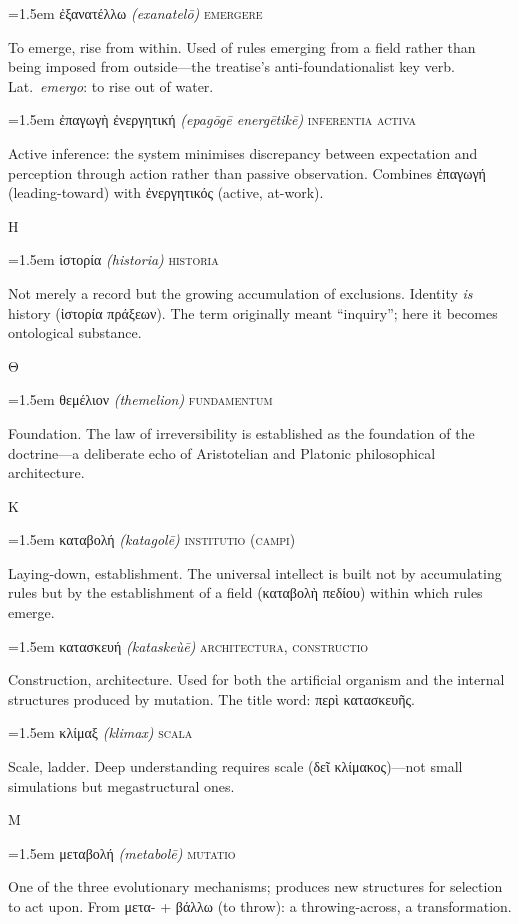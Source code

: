 \documentclass[12pt, oneside, openany]{memoir}
\newcommand{\gk}[1]{\textgreek{#1}}
\newcommand{\gkblue}[1]{{\color{greekblue}\textgreek{#1}}}
\newcommand{\gentry}[4]{%
  \noindent\hangindent=1.5em
  {\gkblue{#1}}\enspace
  {\itshape(#2)}\enspace
  {\color{rubricate}\textperiodcentered}\enspace
  {\scshape #3}\par
  \hspace*{1.5em}%
  \parbox[t]{\dimexpr\linewidth-1.5em\relax}{\strut#4\strut}%
  \par\addvspace{6pt}}
\begin{document}
\gentry{ἐξανατέλλω}{exanatel\={o}}{emergere}
{To emerge, rise from within. Used of rules emerging from a field rather than being imposed from outside---the treatise's anti-foundationalist key verb. Lat.\ \textit{emergo}: to rise out of water.}

\gentry{ἐπαγωγὴ ἐνεργητική}{epag\={o}g\={e} energ\={e}tik\={e}}{inferentia activa}
{Active inference: the system minimises discrepancy between expectation and perception through action rather than passive observation. Combines \gk{ἐπαγωγή} (leading-toward) with \gk{ἐνεργητικός} (active, at-work).}

\bigskip
{\centering\color{rubricate}\large\scshape Η \par}\medskip

\gentry{ἱστορία}{historia}{historia}
{Not merely a record but the growing accumulation of exclusions. Identity \emph{is} history (\gk{ἱστορία πράξεων}). The term originally meant ``inquiry''; here it becomes ontological substance.}

\bigskip
{\centering\color{rubricate}\large\scshape Θ \par}\medskip

\gentry{θεμέλιον}{themelion}{fundamentum}
{Foundation. The law of irreversibility is established as the foundation of the doctrine---a deliberate echo of Aristotelian and Platonic philosophical architecture.}

\bigskip
{\centering\color{rubricate}\large\scshape Κ \par}\medskip

\gentry{καταβολή}{katagol\={e}}{institutio (campi)}
{Laying-down, establishment. The universal intellect is built not by accumulating rules but by the establishment of a field (\gk{καταβολὴ πεδίου}) within which rules emerge.}

\gentry{κατασκευή}{kataskeù\={e}}{architectura, constructio}
{Construction, architecture. Used for both the artificial organism and the internal structures produced by mutation. The title word: \gk{περὶ κατασκευῆς}.}

\gentry{κλίμαξ}{klimax}{scala}
{Scale, ladder. Deep understanding requires scale (\gk{δεῖ κλίμακος})---not small simulations but megastructural ones.}

\bigskip
{\centering\color{rubricate}\large\scshape Μ \par}\medskip

\gentry{μεταβολή}{metabol\={e}}{mutatio}
{One of the three evolutionary mechanisms; produces new structures for selection to act upon. From \gk{μετα-} + \gk{βάλλω} (to throw): a throwing-across, a transformation.}
\end{document}
